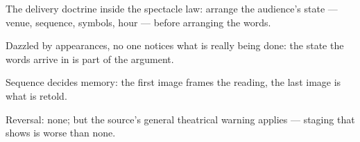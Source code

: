 

\begin{distilled}
  \item The delivery doctrine inside the spectacle law: arrange the audience's state --- venue, sequence, symbols, hour --- before arranging the words.
  \item Dazzled by appearances, no one notices what is really being done: the state the words arrive in is part of the argument.
  \item Sequence decides memory: the first image frames the reading, the last image is what is retold.
  \item Reversal: none; but the source's general theatrical warning applies --- staging that shows is worse than none.
\end{distilled}
